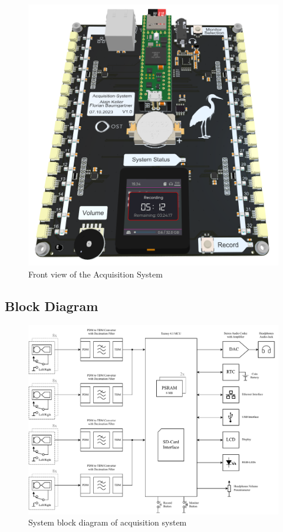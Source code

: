 \begin{figure}[h]
	\centering
	\includegraphics[width=1.0\textwidth]{images/4_design_acquisition_system/Acquisition_System_Front.png}
	\caption{Front view of the Acquisition System}
	\label{fig:acquisition_system_front}
\end{figure}


\subsection{Block Diagram}

\begin{figure}[h]
	\centering
	\includegraphics[width=1.0\textwidth]{images/4_design_acquisition_system/acquisition_system_design_block_diagram.pdf}
	\caption{System block diagram of acquisition system}
	\label{fig:acquisition_system_design_block_diagram}
\end{figure}

